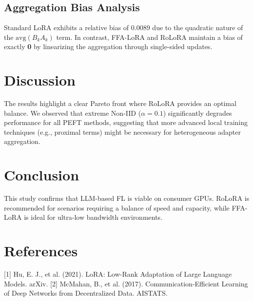 \documentclass[twocolumn]{article}
\begin{document}
\subsection{Aggregation Bias Analysis}
Standard LoRA exhibits a relative bias of 0.0089 due to the quadratic nature of the $\text{avg}(B_k A_k)$ term. In contrast, FFA-LoRA and RoLoRA maintain a bias of exactly \textbf{0} by linearizing the aggregation through single-sided updates.

\section{Discussion}
The results highlight a clear Pareto front where RoLoRA provides an optimal balance. We observed that extreme Non-IID ($\alpha=0.1$) significantly degrades performance for all PEFT methods, suggesting that more advanced local training techniques (e.g., proximal terms) might be necessary for heterogeneous adapter aggregation.

\section{Conclusion}
This study confirms that LLM-based FL is viable on consumer GPUs. RoLoRA is recommended for scenarios requiring a balance of speed and capacity, while FFA-LoRA is ideal for ultra-low bandwidth environments.

\section*{References}
[1] Hu, E. J., et al. (2021). LoRA: Low-Rank Adaptation of Large Language Models. arXiv.
[2] McMahan, B., et al. (2017). Communication-Efficient Learning of Deep Networks from Decentralized Data. AISTATS.
\end{document}
